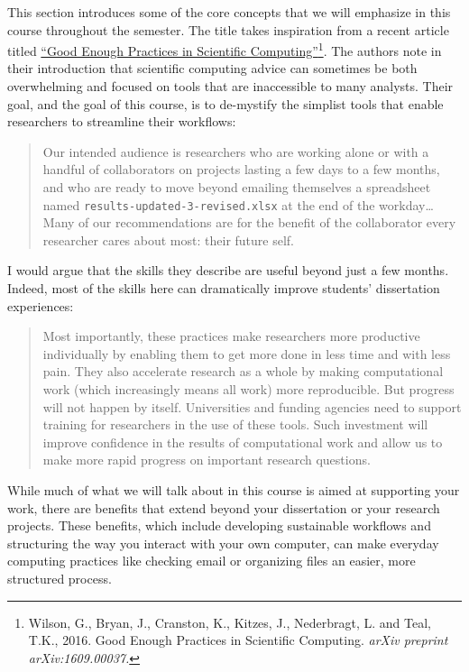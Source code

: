 \documentclass[]{book}
\let\rmarkdownfootnote\footnote%
\def\footnote{\protect\rmarkdownfootnote}
\begin{document}
This section introduces some of the core concepts that we will emphasize
in this course throughout the semester. The title takes inspiration from
a recent article titled \href{https://arxiv.org/abs/1609.00037}{``Good
Enough Practices in Scientific Computing''}\footnote{Wilson, G., Bryan,
  J., Cranston, K., Kitzes, J., Nederbragt, L. and Teal, T.K., 2016.
  Good Enough Practices in Scientific Computing. \emph{arXiv preprint
  arXiv:1609.00037.}}. The authors note in their introduction that
scientific computing advice can sometimes be both overwhelming and
focused on tools that are inaccessible to many analysts. Their goal, and
the goal of this course, is to de-mystify the simplist tools that enable
researchers to streamline their workflows:

\begin{quote}
Our intended audience is researchers who are working alone or with a
handful of collaborators on projects lasting a few days to a few months,
and who are ready to move beyond emailing themselves a spreadsheet named
\texttt{results-updated-3-revised.xlsx} at the end of the
workday\ldots{}Many of our recommendations are for the benefit of the
collaborator every researcher cares about most: their future self.
\end{quote}

I would argue that the skills they describe are useful beyond just a few
months. Indeed, most of the skills here can dramatically improve
students' dissertation experiences:

\begin{quote}
Most importantly, these practices make researchers more productive
individually by enabling them to get more done in less time and with
less pain. They also accelerate research as a whole by making
computational work (which increasingly means all work) more
reproducible. But progress will not happen by itself. Universities and
funding agencies need to support training for researchers in the use of
these tools. Such investment will improve confidence in the results of
computational work and allow us to make more rapid progress on important
research questions.
\end{quote}

While much of what we will talk about in this course is aimed at
supporting your work, there are benefits that extend beyond your
dissertation or your research projects. These benefits, which include
developing sustainable workflows and structuring the way you interact
with your own computer, can make everyday computing practices like
checking email or organizing files an easier, more structured process.
\end{document}
